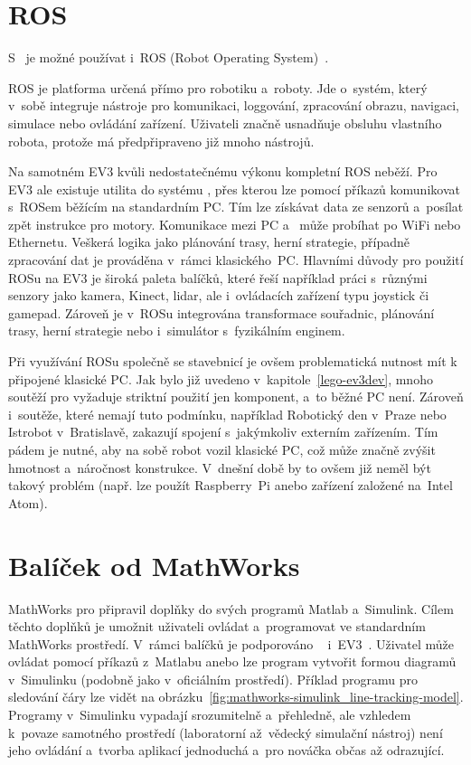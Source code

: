 \section{ROS}

S~\legoEV{} je možné používat i~ROS (Robot Operating System)~\cite{legoProgramingPlatform_ROS}. 

ROS je platforma určená přímo pro robotiku a~roboty. 
Jde o~systém, který v~sobě integruje nástroje pro komunikaci, loggování, zpracování obrazu, navigaci, simulace nebo ovládání zařízení. 
Uživateli značně usnadňuje obsluhu vlastního robota, protože má předpřipraveno již mnoho nástrojů.

Na samotném EV3 kvůli nedostatečnému výkonu   kompletní ROS neběží.
Pro EV3 ale existuje utilita do systému \evThreeDev{}, přes kterou lze pomocí příkazů komunikovat s~ROSem běžícím na standardním PC. 
Tím lze získávat data ze senzorů a~posílat zpět instrukce pro motory. 
Komunikace mezi PC a~ může probíhat po WiFi nebo Ethernetu.
Veškerá logika jako plánování trasy, herní strategie, případně zpracování dat je prováděna v~rámci klasického~PC.
Hlavními důvody pro použití ROSu na EV3 je široká paleta balíčků, které řeší například práci s~různými senzory jako kamera, Kinect, lidar, ale i~ovládacích zařízení typu joystick či gamepad. 
Zároveň je v~ROSu integrována transformace souřadnic, plánování trasy, herní strategie nebo i~simulátor s~fyzikálním enginem.


Při využívání ROSu společně se stavebnicí \lego{} je ovšem problematická nutnost mít k~ připojené klasické PC. 
Jak bylo již uvedeno v~kapitole~\ref{lego-ev3dev}, mnoho soutěží pro \legoM{} vyžaduje striktní použití jen \lego{} komponent, a~to běžné PC není. 
Zároveň i~soutěže, které nemají tuto podmínku, například Robotický den v~Praze nebo Istrobot v~Bratislavě, zakazují spojení s~jakýmkoliv externím zařízením.
Tím pádem je nutné, aby na sobě \lego{} robot vozil klasické PC, což může značně zvýšit hmotnost a~náročnost konstrukce. 
V~dnešní době by to ovšem již neměl být takový problém (např. lze použít Raspberry~Pi anebo zařízení založené na~Intel Atom).

\section{Balíček od MathWorks}
\label{lego-alternative-soft_mathworks}

MathWorks pro \legoM{} připravil doplňky do svých programů Mat\-lab a~Simulink. 
Cílem těchto doplňků je umožnit uživateli ovládat a~programovat \legoM{} ve standardním MathWorks prostředí. 
V~rámci balíčků je podporováno \legoNXT~\cite{legoProgramingPlatform_MathWork-NXT} i~EV3~\cite{legoProgramingPlatform_MathWork-EV3}.
Uživatel může ovládat \brick{} pomocí příkazů z~Mat\-la\-bu anebo lze program vytvořit formou diagramů v~Simulinku (podobně jako v~oficiálním \lego{} prostředí). 
Příklad programu pro sledování čáry lze vidět na obrázku~\ref{fig:mathworks-simulink_line-tracking-model}.
Programy v~Simulinku vypadají srozumitelně a~přehledně, ale vzhledem k~povaze samotného prostředí (laboratorní až~vědecký simulační nástroj) není jeho ovládání a~tvorba aplikací jednoduchá a~pro nováčka občas až odrazující. 

